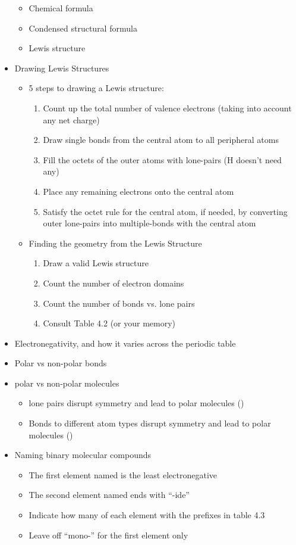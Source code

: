 \documentclass[12pt, letterpaper]{memoir}
\begin{document}
\begin{itemize}
		\begin{itemize}
			\item Chemical formula
			\item Condensed structural formula
			\item Lewis structure
		\end{itemize}
		\item Drawing Lewis Structures
		\begin{itemize}
			\item 5 steps to drawing a Lewis structure:
			\begin{enumerate}
				\item Count up the total number of valence electrons (taking into account any net charge)
				\item Draw single bonds from the central atom to all peripheral atoms
				\item Fill the octets of the outer atoms with lone-pairs (H doesn't need any)
				\item Place any remaining electrons onto the central atom
				\item Satisfy the octet rule for the central atom, if needed, by converting outer lone-pairs into multiple-bonds with the central atom
			\end{enumerate}
			\item Finding the geometry from the Lewis Structure
			\begin{enumerate}
				\item Draw a valid Lewis structure
				\item Count the number of electron domains
				\item Count the number of bonds vs. lone pairs
				\item Consult Table 4.2 (or your memory)
			\end{enumerate}
		\end{itemize}
		\item Electronegativity, and how it varies across the periodic table
		\item Polar vs non-polar bonds
		\item polar vs non-polar molecules
		\begin{itemize}
			\item lone pairs disrupt symmetry and lead to polar molecules ()
			\item Bonds to different atom types disrupt symmetry and lead to polar molecules ()
		\end{itemize}
		\item Naming binary molecular compounds
		\begin{itemize}
			\item The first element named is the least electronegative
			\item The second element named ends with ``-ide''
			\item Indicate how many of each element with the prefixes in table 4.3
			\item Leave off ``mono-'' for the first element only
		\end{itemize}
	\end{itemize}
\end{document}
